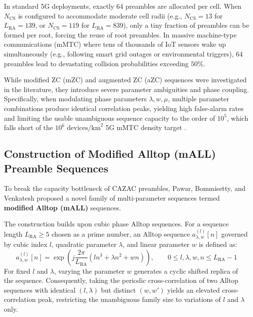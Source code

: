 In standard 5G deployments, exactly 64 preambles are allocated per cell. When $N_{\mathrm{CS}}$ is configured to accommodate moderate cell radii (e.g., $N_{\mathrm{CS}} = 13$ for $L_{\mathrm{RA}} = 139$, or $N_{\mathrm{CS}} = 119$ for $L_{\mathrm{RA}} = 839$), only a tiny fraction of preambles can be formed per root, forcing the reuse of root preambles. In massive machine-type communications (mMTC) where tens of thousands of IoT sensors wake up simultaneously (e.g., following smart grid outages or environmental triggers), 64 preambles lead to devastating collision probabilities exceeding $50\%$.

While modified ZC (mZC) and augmented ZC (aZC) sequences were investigated in the literature, they introduce severe parameter ambiguities and phase coupling. Specifically, when modulating phase parameters $\lambda, w, \mu$, multiple parameter combinations produce identical correlation peaks, yielding high false-alarm rates and limiting the usable unambiguous sequence capacity to the order of $10^5$, which falls short of the $10^6\text{~devices/km}^2$ 5G mMTC density target \cite{pawar2023high}.

\subsection{Construction of Modified Alltop (mALL) Preamble Sequences}
To break the capacity bottleneck of CAZAC preambles, Pawar, Bommisetty, and Venkatesh \cite{pawar2023high} proposed a novel family of multi-parameter sequences termed \textbf{modified Alltop (mALL)} sequences.

The construction builds upon cubic phase Alltop sequences. For a sequence length $L_{\mathrm{RA}} \ge 5$ chosen as a prime number, an Alltop sequence $a_{\lambda, w}^{(l)}[n]$ governed by cubic index $l$, quadratic parameter $\lambda$, and linear parameter $w$ is defined as:
\begin{equation}
    \label{eq:alltop_def}
    a_{\lambda, w}^{(l)}[n] = \exp\left( j \frac{2\pi}{L_{\mathrm{RA}}} \left( l n^3 + \lambda n^2 + w n \right) \right), \qquad 0 \le l, \lambda, w, n \le L_{\mathrm{RA}} - 1
\end{equation}
For fixed $l$ and $\lambda$, varying the parameter $w$ generates a cyclic shifted replica of the sequence. Consequently, taking the periodic cross-correlation of two Alltop sequences with identical $(l, \lambda)$ but distinct $(w, w')$ yields an elevated cross-correlation peak, restricting the unambiguous family size to variations of $l$ and $\lambda$ only.


